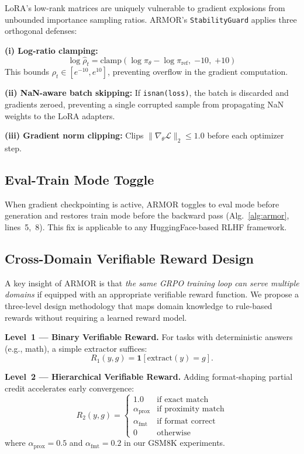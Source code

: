 \documentclass{ieeeaccess}
\begin{document}
LoRA's low-rank matrices are uniquely vulnerable to gradient explosions from unbounded
importance sampling ratios. ARMOR's \texttt{StabilityGuard} applies three orthogonal defenses:

\textbf{(i) Log-ratio clamping:}
\begin{equation}
\log\hat\rho_t = \mathrm{clamp}(\log\pi_\theta - \log\pi_{\mathrm{ref}},\;{-10},\;{+10})
\label{eq:clamp}
\end{equation}
This bounds $\rho_t \in [e^{-10}, e^{10}]$, preventing overflow in the gradient computation.

\textbf{(ii) NaN-aware batch skipping:}
If \texttt{isnan(loss)}, the batch is discarded and gradients zeroed,
preventing a single corrupted sample from propagating NaN weights to the LoRA adapters.

\textbf{(iii) Gradient norm clipping:}
Clips $\|\nabla_\theta\mathcal{L}\|_2 \leq 1.0$ before each optimizer step.

\subsection{Eval-Train Mode Toggle}
\label{sec:mode_toggle}

When gradient checkpointing is active,
ARMOR toggles to eval mode before generation and restores
train mode before the backward pass (Alg.~\ref{alg:armor}, lines~5,~8).
This fix is applicable to any HuggingFace-based RLHF framework.

\subsection{Cross-Domain Verifiable Reward Design}
\label{sec:reward}

A key insight of ARMOR is that \emph{the same GRPO training loop can serve
multiple domains} if equipped with an appropriate verifiable reward function.
We propose a three-level design methodology that maps domain knowledge
to rule-based rewards without requiring a learned reward model.

\textbf{Level~1 --- Binary Verifiable Reward.}
For tasks with deterministic answers (e.g., math), a simple extractor
suffices:
\begin{equation}
R_1(y,g) = \mathbf{1}[\mathrm{extract}(y) = g].
\label{eq:r1}
\end{equation}

\textbf{Level~2 --- Hierarchical Verifiable Reward.}
Adding format-shaping partial credit accelerates early convergence:
\begin{equation}
R_2(y,g) =
\begin{cases}
1.0 & \text{if exact match}\\
\alpha_{\mathrm{prox}} & \text{if proximity match}\\
\alpha_{\mathrm{fmt}} & \text{if format correct}\\
0 & \text{otherwise}
\end{cases}
\label{eq:r2}
\end{equation}
where $\alpha_{\mathrm{prox}}{=}0.5$ and $\alpha_{\mathrm{fmt}}{=}0.2$ in our
GSM8K experiments.
\end{document}
